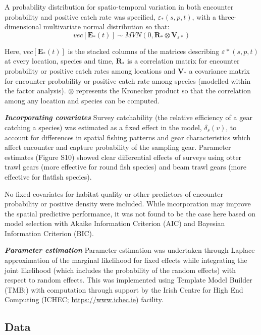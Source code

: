 \documentclass{nature}
\begin{document}
\begin{linenumbers}
A probability distribution for spatio-temporal variation in both encounter
probability and positive catch rate was specified, $\varepsilon_{*}(s,p,t)$,
with a three-dimensional multivariate normal distribution so that:
	\begin{equation}
		vec[\mathbf{E}_{*}(t)] \sim MVN(0,\mathbf{R}_{*} \otimes
		\mathbf{V}_{{\varepsilon}{*}})
	\end{equation}

Here, $vec[\mathbf{E}_{*}(t)]$ is the stacked columns of the matrices
describing $\varepsilon{*}(s,p,t)$ at every location, species and time,
$\mathbf{R}_{*}$ is a correlation matrix for encounter probability or positive
catch rates among locations and $\mathbf{V}_{*}$ a covariance matrix for
encounter probability or positive catch rate among species (modelled within the
factor analysis). $\otimes$ represents the Kronecker product so that the
correlation among any location and species can be computed\cite{Thorson2017}.
		
\textbf{\textit{Incorporating covariates}} Survey catchability (the relative
efficiency of a gear catching a species) was estimated as a fixed effect in the
model, $\delta_{s}(v)$, to account for differences in spatial fishing patterns
and gear characteristics which affect encounter and capture probability of the
sampling gear\cite{Thorson2014}. Parameter estimates (Figure S10) showed clear
differential effects of surveys using otter trawl gears (more effective for
round fish species) and beam trawl gears (more effective for flatfish species).

No fixed covariates for habitat quality or other predictors of encounter
probability or positive density were included. While incorporation may improve
the spatial predictive performance\cite{Thorson2017}, it was not found to be
the case here based on model selection with Akaike Information Criterion (AIC)
and Bayesian Information Criterion (BIC).

\textbf{\textit{Parameter estimation}} Parameter estimation was undertaken
through Laplace approximation of the marginal likelihood for fixed effects
while integrating the joint likelihood (which includes the probability of the
random effects) with respect to random effects. This was implemented using
Template Model Builder (TMB;\cite{Kristensen2015}) with computation through
support by the Irish Centre for High End Computing (ICHEC;
\url{https://www.ichec.ie}) facility.  

\subsection{Data}


\end{linenumbers}
\end{document}
